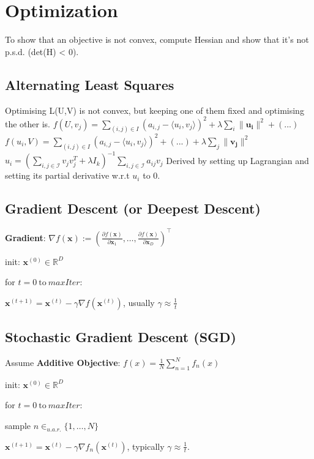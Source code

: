 \section{Optimization}
To show that an objective is not convex, compute Hessian and show that it's not p.s.d. (det(H) < 0).

\subsection*{Alternating Least Squares}
Optimising L(U,V) is not convex, but keeping one of them fixed and optimising the other is.
$f(U,v_j)=\sum_{(i,j)\in I} (a_{i,j} - \langle u_i, v_j \rangle)^2 + \lambda \sum_i \lVert\mathbf{u_i}\rVert^2 +(...)$\\
$f(u_i,V)=\sum_{(i,j)\in I} (a_{i,j} - \langle u_i, v_j \rangle)^2 + (...) + \lambda \sum_j \lVert\mathbf{v_j}\rVert^2$\\
$u_i = (\sum_{i,j \in \mathcal{I}} v_jv_j^T + \lambda I_k)^{-1} \sum_{i,j \in \mathcal{I}} a_{ij}v_j$
Derived by setting up Lagrangian and setting its partial derivative w.r.t $u_i$ to 0.

\subsection*{Gradient Descent (or Deepest Descent)}
\textbf{Gradient}: $\nabla f(\mathbf{x}) := \left( \frac{\partial f(\mathbf{x})}{\partial \mathbf{x}_1}, \ldots, \frac{\partial f(\mathbf{x})}{\partial \mathbf{x}_D} \right)^\top$

\begin{inparaenum}
	\item init: $\mathbf{x}^{(0)} \in \mathbb{R}^D$
	\item for $t = 0 \ \text{to} \ \mathit{maxIter}$:
	\item $\mathbf{x}^{(t+1)} = \mathbf{x}^{(t)} - \gamma \nabla f(\mathbf{x}^{(t)})$, usually $\gamma \approx \frac{1}{t}$
\end{inparaenum}

\subsection*{Stochastic Gradient Descent (SGD)}
Assume \textbf{Additive Objective}: $f(x) = \frac{1}{N}\sum_{n=1}^{N}f_n(x)$\\

\begin{inparaenum}
	\item init: $\mathbf{x}^{(0)} \in \mathbb{R}^D$
	\item for $t = 0 \ \text{to} \ \mathit{maxIter}$:
	\item sample $n \in_{u.a.r.} \{1, \ldots, N\}$
	\item $\mathbf{x}^{(t+1)} = \mathbf{x}^{(t)} - \gamma \nabla f_n(\mathbf{x}^{(t)})$, typically  $\gamma \approx \frac{1}{t}$.
\end{inparaenum}

